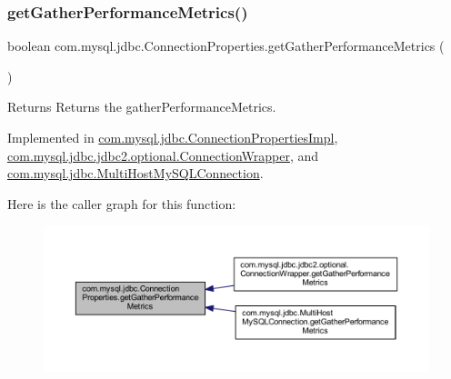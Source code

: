 \subsubsection{\texorpdfstring{get\+Gather\+Performance\+Metrics()}{getGatherPerformanceMetrics()}}
{\footnotesize\ttfamily boolean com.\+mysql.\+jdbc.\+Connection\+Properties.\+get\+Gather\+Performance\+Metrics (\begin{DoxyParamCaption}{ }\end{DoxyParamCaption})}

\begin{DoxyReturn}{Returns}
Returns the gather\+Performance\+Metrics. 
\end{DoxyReturn}


Implemented in \mbox{\hyperlink{classcom_1_1mysql_1_1jdbc_1_1_connection_properties_impl_a2e0086f3bd63c1bc9e7e6457ed41c996}{com.\+mysql.\+jdbc.\+Connection\+Properties\+Impl}}, \mbox{\hyperlink{classcom_1_1mysql_1_1jdbc_1_1jdbc2_1_1optional_1_1_connection_wrapper_ae72446f233d8b35fc273fa47006502d0}{com.\+mysql.\+jdbc.\+jdbc2.\+optional.\+Connection\+Wrapper}}, and \mbox{\hyperlink{classcom_1_1mysql_1_1jdbc_1_1_multi_host_my_s_q_l_connection_a5e3312dbc7d1e713c67aa90d1d7527be}{com.\+mysql.\+jdbc.\+Multi\+Host\+My\+S\+Q\+L\+Connection}}.

Here is the caller graph for this function\+:\nopagebreak
\begin{figure}[H]
\begin{center}
\leavevmode
\includegraphics[width=350pt]{interfacecom_1_1mysql_1_1jdbc_1_1_connection_properties_a90f58aa61c84d2072ba37c902aef8f9e_icgraph}
\end{center}
\end{figure}
\mbox{\label{interfacecom_1_1mysql_1_1jdbc_1_1_connection_properties_a33f1647a0e97bcb10d880500fc9e8cf0}} 
